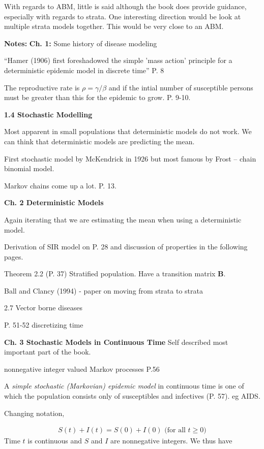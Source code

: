 \message{ !name(refs.tex)}\documentclass{article}
\begin{document}
With regards to ABM, little is said although the book does provide guidance, especially with regards to strata.  One interesting direction would be look at multiple strata models together.  This would be very close to an ABM.

\textbf{Notes:}
\textbf{Ch. 1:}  Some history of disease modeling

``Hamer (1906) first foreshadowed the simple 'mass action' principle for a deterministic epidemic model in discrete time'' P. 8

The reproductive rate is $\rho= \gamma/\beta$ and if the intial number of susceptible persons must be greater than this for the epidemic to grow.  P. 9-10.

\textbf{1.4 Stochastic Modelling}

Most apparent in small populations that deterministic models do not work.  We can think that deterministic models are predicting the mean.

First stochastic model by McKendrick in 1926 but most famous by Frost -- chain binomial model.

Markov chains come up a lot.  P. 13.

\textbf{Ch. 2 Deterministic Models}

Again iterating that we are estimating the mean when using a deterministic model.

Derivation of SIR model on P. 28 and discussion of properties in the following pages.

Theorem 2.2 (P. 37) Stratified population.  Have a transition matrix $\textbf{B}$.

Ball and Clancy (1994) - paper on moving from strata to strata

2.7 Vector borne diseases

P. 51-52 discretizing time

\textbf{Ch. 3 Stochastic Models in Continuous Time}
Self described most important part of the book.

nonnegative integer valued Markov processes P.56

A \textit{simple stochastic (Markovian) epidemic model} in continuous time is one of which the population consists only of susceptibles and infectives (P. 57).  eg AIDS.  

Changing notation,

\begin{align*}
S(t) + I(t) = S(0) + I(0) \text{ (for all } t \ge 0)
\end{align*}
Time $t$ is continuous and $S$ and $I$ are nonnegative integers.  We thus have
\end{document}

